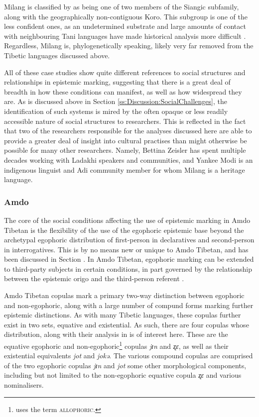 Milang is classified by  as being one of two members of the Siangic subfamily, along with the geographically non-contiguous Koro. This subgroup is one of the less confident ones, as an undetermined substrate and large amounts of contact with neighbouring Tani languages have made historical analysis more difficult \cite{Modi2017}. Regardless, Milang is, phylogenetically speaking, likely very far removed from the Tibetic languages discussed above.

All of these case studies show quite different references to social structures and relationships in epistemic marking, suggesting that there is a great deal of breadth in how these conditions can manifest, as well as how widespread they are. As is discussed above in Section \ref{ss:Discussion:SocialChallenges}, the identification of such systems is mired by the often opaque or less readily accessible nature of social structures to researchers. This is reflected in the fact that two of the researchers responsible for the analyses discussed here are able to provide a greater deal of insight into cultural practises than might otherwise be possible for many other researchers. Namely, Bettina Zeisler has spent multiple decades working with Ladakhi speakers and communities, and Yankee Modi is an indigenous linguist and Adi community member for whom Milang is a heritage language.

\subsubsection{Amdo}\label{sss:Discussion:AmdoCase}
The core of the social conditions affecting the use of epistemic marking in Amdo Tibetan is the flexibility of the use of the egophoric epistemic base beyond the archetypal egophoric distribution of first-person in declaratives and second-person in interrogatives. This is by no means new or unique to Amdo Tibetan, and has been discussed in Section . In Amdo Tibetan, egophoric marking can be extended to third-party subjects in certain conditions, in part governed by the relationship between the epistemic origo and the third-person referent \cite{Tribur2019}.

Amdo Tibetan copulas mark a primary two-way distinction between egophoric and non-egophoric, along with a large number of compund forms marking further epistemic distinctions. As with many Tibetic languages, these copulas further exist in two sets, equative and existential. As such, there are four copulas whose distribution, along with their analysis in  is of interest here. These are the equative egophoric and non-egophoric\footnote{ uses the term \textsc{allophoric}.} copulas \textit{jɪn} and \textit{ʐɛ}, as well as their existential equivalents \textit{jot} and \textit{jokə}. The various compound copulas are comprised of the two egophoric copulas \textit{jɪn} and \textit{jot} some other morphological components, including but not limited to the non-egophoric equative copula \textit{ʐɛ} and various nominalisers.


